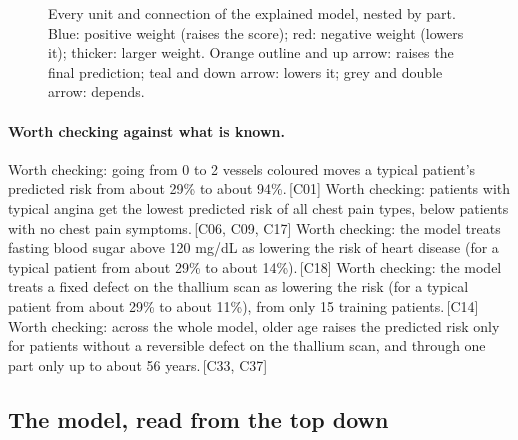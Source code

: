\documentclass[a4paper,10pt]{article}
\newif\ifreviewmarks
\newcommand{\reviewrule}{\noindent{\color{BrickRed}\rule{\linewidth}{0.8pt}}}
\newenvironment{drafted}[1][]{%
  \ifreviewmarks\par\addvspace{\medskipamount}\reviewrule\par\nopagebreak
  \noindent{\color{BrickRed}\sffamily\footnotesize\textbf{Thesis Draft}\quad #1\hfill review}\par\nopagebreak\smallskip\fi}{%
  \ifreviewmarks\par\smallskip\noindent{\color{BrickRed}\sffamily\footnotesize end of thesis draft}\par\nopagebreak\reviewrule\par\medskip\fi}
\begin{document}
\begin{drafted}[plain-language layer: heart-s2-c1]
\begin{landscape}
\begin{figure}[p]
{}%
\caption{Every unit and connection of the explained model, nested by part. Blue: positive weight (raises the score); red: negative weight (lowers it); thicker: larger weight. Orange outline and up arrow: raises the final prediction; teal and down arrow: lowers it; grey and double arrow: depends.}
\label{fig:hearts2c1:overview}
\end{figure}
\end{landscape}
\paragraph{Worth checking against what is known.} Worth checking: going from 0 to 2 vessels coloured moves a typical patient's predicted risk from about 29\% to about 94\%.\,{\scriptsize\textcolor{NavyBlue}{[C01]}} Worth checking: patients with typical angina get the lowest predicted risk of all chest pain types, below patients with no chest pain symptoms.\,{\scriptsize\textcolor{NavyBlue}{[C06, C09, C17]}} Worth checking: the model treats fasting blood sugar above 120 mg/dL as lowering the risk of heart disease (for a typical patient from about 29\% to about 14\%).\,{\scriptsize\textcolor{NavyBlue}{[C18]}} Worth checking: the model treats a fixed defect on the thallium scan as lowering the risk (for a typical patient from about 29\% to about 11\%), from only 15 training patients.\,{\scriptsize\textcolor{NavyBlue}{[C14]}} Worth checking: across the whole model, older age raises the predicted risk only for patients without a reversible defect on the thallium scan, and through one part only up to about 56 years.\,{\scriptsize\textcolor{NavyBlue}{[C33, C37]}}
\subsection{The model, read from the top down}

\end{drafted}
\end{document}
